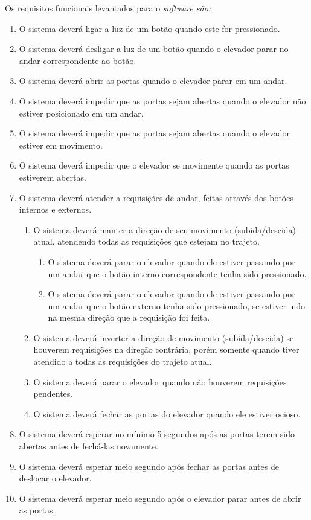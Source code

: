 Os requisitos funcionais levantados para o \it{software} são:

\begin{enumerate}[label=RF \arabic*. , ref=\arabic*]
	\item O sistema deverá ligar a luz de um botão quando este for pressionado.
  \item O sistema deverá desligar a luz de um botão quando o elevador parar no andar correspondente ao botão.
  \item O sistema deverá abrir as portas quando o elevador parar em um andar.
  \item O sistema deverá impedir que as portas sejam abertas quando o elevador não estiver posicionado em um andar.
  \item O sistema deverá impedir que as portas sejam abertas quando o elevador estiver em movimento.
  \item O sistema deverá impedir que o elevador se movimente quando as portas estiverem abertas.
  \item O sistema deverá atender a requisições de andar, feitas através dos botões internos e externos.
  \begin{enumerate}[label*=\arabic*.]
    \item O sistema deverá manter a direção de seu movimento (subida/descida) atual, atendendo todas as requisições que estejam no trajeto.
    \begin{enumerate}[label*=\arabic*.]
        \item O sistema deverá parar o elevador quando ele estiver passando por um andar que o botão interno correspondente tenha sido pressionado.
        \item O sistema deverá parar o elevador quando ele estiver passando por um andar que o botão externo tenha sido pressionado, se estiver indo na mesma direção que a requisição foi feita.
    \end{enumerate}
    \item O sistema deverá inverter a direção de movimento (subida/descida) se houverem requisições na direção contrária, porém somente quando tiver atendido a todas as requisições do trajeto atual.

    \item O sistema deverá parar o elevador quando não houverem requisições pendentes.
    \item O sistema deverá fechar as portas do elevador quando ele estiver ocioso.
    
  \end{enumerate}
  \item O sistema deverá esperar no mínimo 5 segundos após as portas terem sido abertas antes de fechá-las novamente.
  \item O sistema deverá esperar meio segundo após fechar as portas antes de deslocar o elevador.
  \item O sistema deverá esperar meio segundo após o elevador parar antes de abrir as portas.
\end{enumerate}

